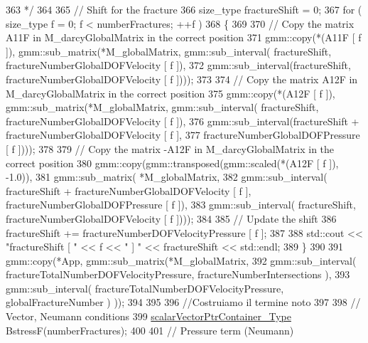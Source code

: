 \begin{DoxyCode}
363 \textcolor{comment}{     */} 
364  
365     \textcolor{comment}{// Shift for the fracture}
366     size\_type fractureShift = 0;
367     \textcolor{keywordflow}{for} ( size\_type f = 0; f < numberFractures; ++f )
368     \{
369 
370         \textcolor{comment}{// Copy the matrix A11F in M\_darcyGlobalMatrix in the correct position}
371         gmm::copy(*(A11F [ f ]), gmm::sub\_matrix(*M\_globalMatrix, gmm::sub\_interval( fractureShift, 
      fractureNumberGlobalDOFVelocity [ f ]),
372                                                                   gmm::sub\_interval(fractureShift, 
      fractureNumberGlobalDOFVelocity [ f ])));
373 
374         \textcolor{comment}{// Copy the matrix A12F in M\_darcyGlobalMatrix in the correct position}
375         gmm::copy(*(A12F [ f ]), gmm::sub\_matrix(*M\_globalMatrix, gmm::sub\_interval( fractureShift, 
      fractureNumberGlobalDOFVelocity [ f ]),
376                                                                   gmm::sub\_interval(fractureShift + 
      fractureNumberGlobalDOFVelocity [ f ], 
377                                                                                     
      fractureNumberGlobalDOFPressure [ f ])));
378 
379         \textcolor{comment}{// Copy the matrix -A12F in M\_darcyGlobalMatrix in the correct position}
380         gmm::copy(gmm::transposed(gmm::scaled(*(A12F [ f ]), -1.0)), 
381                                   gmm::sub\_matrix( *M\_globalMatrix, 
382                                           gmm::sub\_interval( fractureShift + 
      fractureNumberGlobalDOFVelocity [ f ], fractureNumberGlobalDOFPressure [ f ]), 
383                                           gmm::sub\_interval( fractureShift, fractureNumberGlobalDOFVelocity
       [ f ])));
384    
385         \textcolor{comment}{// Update the shift}
386         fractureShift += fractureNumberDOFVelocityPressure [ f ];
387  
388         std::cout << \textcolor{stringliteral}{"fractureShift [ "} << f << \textcolor{stringliteral}{" ] "} << fractureShift << std::endl;
389     \}
390 
391     gmm::copy(*App, gmm::sub\_matrix(*M\_globalMatrix, 
392             gmm::sub\_interval( fractureTotalNumberDOFVelocityPressure, fractureNumberIntersections ), 
393             gmm::sub\_interval( fractureTotalNumberDOFVelocityPressure, globalFractureNumber ) ));
394   
395     
396     \textcolor{comment}{//Costruiamo il termine noto}
397     
398     \textcolor{comment}{// Vector, Neumann conditions}
399     \hyperlink{Core_8h_a20f0354ac7b92989514c678f4cdfcb6b}{scalarVectorPtrContainer\_Type} BstressF(numberFractures);
400 
401     \textcolor{comment}{// Pressure term (Neumann)}

\end{DoxyCode}
